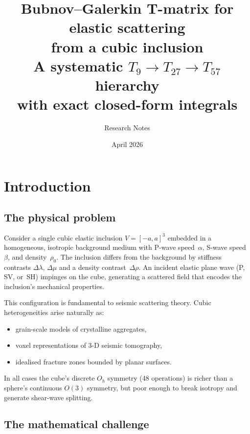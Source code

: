 \documentclass[11pt,a4paper]{article}
\title{Bubnov--Galerkin T-matrix for elastic scattering\\
from a cubic inclusion\\[6pt]
\large A systematic $T_9 \to T_{27} \to T_{57}$ hierarchy\\
with exact closed-form integrals}
\author{Research Notes}
\date{April 2026}
\newcommand{\D}{\Delta}
\newcommand{\Oh}{O_h}
\theoremstyle{plain}
\theoremstyle{definition}
\theoremstyle{remark}
\begin{document}
\maketitle
\tableofcontents
\vspace{1em}

\section{Introduction}
\label{sec:introduction}

\subsection{The physical problem}

Consider a single cubic elastic inclusion $V = [-a,a]^3$ embedded in
a homogeneous, isotropic background medium with P-wave speed~$\alpha$,
S-wave speed~$\beta$, and density~$\rho_0$.  The inclusion differs
from the background by stiffness contrasts $\D\lambda$, $\D\mu$ and
a density contrast~$\D\rho$.  An incident elastic plane wave
(P, SV, or~SH) impinges on the cube, generating a scattered field
that encodes the inclusion's mechanical properties.

This configuration is fundamental to seismic scattering theory.
Cubic heterogeneities arise naturally as:
\begin{itemize}[nosep]
  \item grain-scale models of crystalline aggregates,
  \item voxel representations of 3-D seismic tomography,
  \item idealised fracture zones bounded by planar surfaces.
\end{itemize}
In all cases the cube's discrete $\Oh$ symmetry (48 operations) is
richer than a sphere's continuous $O(3)$ symmetry, but poor enough
to break isotropy and generate shear-wave splitting.

\subsection{The mathematical challenge}
\end{document}
